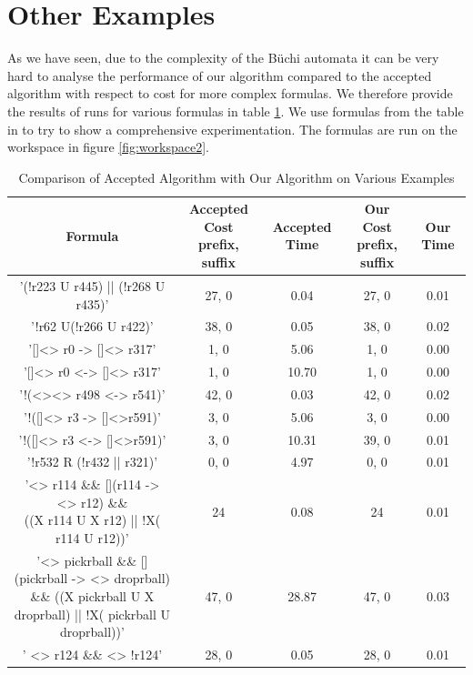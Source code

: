 \section{Other Examples}
As we have seen, due to the complexity of the B\"uchi automata it can be very hard to analyse the performance of our algorithm compared to the accepted algorithm with respect to cost for more complex formulas. We therefore provide the results of runs for various formulas in table \ref{table}. We use formulas from the table in \cite{somenzi00} to try to show a comprehensive experimentation. The formulas are run on the workspace in figure \ref{fig:workspace2}. 

\begin{landscape}
\begin{table}[]
\centering
\small
\begin{tabular}{|c|c|c|c|c|}
\hline
Formula & \makecell{Accepted Cost \\ prefix, suffix} & Accepted Time & \makecell{Our Cost \\ prefix, suffix} & Our Time \\ \hline
     '(!r223 U r445) || (!r268 U r435)'  &         27, 0     &      0.04         &      27, 0   &     0.01     \\ \hline
      '!r62 U(!r266 U r422)'  &         38, 0     &       0.05        &     38, 0     &     0.02     \\ \hline
       '[]<> r0 -> []<> r317' &         1, 0      &       5.06        &    1, 0      &    0.00     \\ \hline
       '[]<> r0 <-> []<> r317'  & 1, 0		&		10.70		& 1, 0 	&  0.00 \\ \hline 
      '!(<><> r498 <-> r541)' &	42, 0	&	0.03	&	42, 0	&	0.02	\\		\hline
      '!([]<> r3 -> []<>r591)' &	 3, 0	&	5.06 	&	3, 0 	&	0.00	\\		\hline
      '!([]<> r3 <-> []<>r591)' &	 3, 0	&	10.31	&	39, 0	&	0.01	\\		\hline
      '!r532 R (!r432 || r321)' &	 0, 0	&	4.97 	&	0, 0	&	0.01 	\\		\hline
     \makecell{ '<> r114 \&\& [](r114 -> <> r12) \&\& \\((X r114 U X r12) || !X( r114 U r12))' }&	24	&	0.08 	&	24	&	0.01	\\		\hline
   \makecell{ '<> pickrball \&\& [](pickrball -> <> droprball) \\ \&\& ((X pickrball U X droprball) || !X( pickrball U droprball))' } &	47, 0	&	28.87	&	47, 0	&	0.03	\\		\hline
      ' <> r124 \&\& <> !r124' &	28, 0	&	0.05 	&	28, 0	&	0.01	\\		\hline
\end{tabular}
\caption{Comparison of Accepted Algorithm with Our Algorithm on Various Examples}
\label{table}
\end{table}
\end{landscape}

